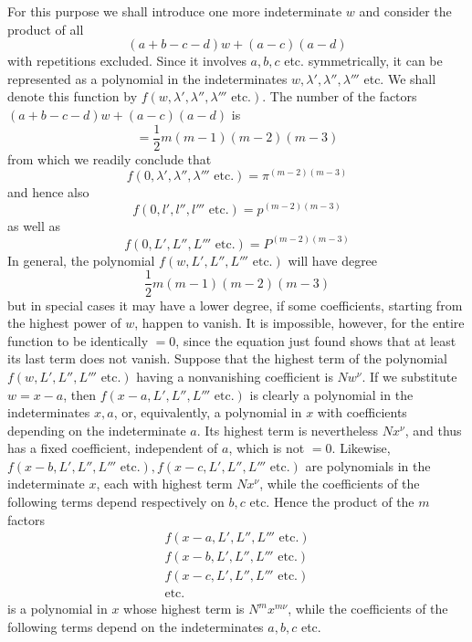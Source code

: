 For this purpose we shall introduce one more indeterminate $w$ and consider the product of all
\[
(a+b-c-d)w+(a-c)(a-d)
\]
with repetitions excluded. Since it involves $a,b,c$ etc. symmetrically, it can be represented as a polynomial in the indeterminates $w,\lambda',\lambda'',\lambda'''$ etc. We shall denote this function by $f(w,\lambda',\lambda'',\lambda'''\text{ etc.})$. The number of the factors $(a+b-c-d)w+(a-c)(a-d)$ is
\[
=\frac12m(m-1)(m-2)(m-3)
\]
from which we readily conclude that
\[
f(0,\lambda',\lambda'',\lambda'''\text{ etc.})=\pi^{(m-2)(m-3)}
\]
and hence also
\[
f(0,l',l'',l'''\text{ etc.})=p^{(m-2)(m-3)}
\]
as well as
\[
f(0,L',L'',L'''\text{ etc.})=P^{(m-2)(m-3)}
\]
In general, the polynomial $f(w,\allowbreak L',\allowbreak L'',\allowbreak L'''\text{ etc.})$ will have degree
\[
\frac12m(m-1)(m-2)(m-3)
\]
but in special cases it may have a lower degree, if some coefficients, starting from the highest power of $w$, happen to vanish. It is impossible, however, for the entire function to be identically $=0$, since
the equation just found shows that at least its last term does not vanish. Suppose that the highest term of the polynomial $f(w,\allowbreak L',\allowbreak L'',\allowbreak L'''\text{ etc.})$ having a nonvanishing coefficient is $Nw^\nu$. If we substitute $w=x-a$, then $f(x-a,L',L'',L'''\text{ etc.})$ is clearly a polynomial in the indeterminates $x,a$, or, equivalently, a polynomial in $x$ with coefficients depending on the indeterminate $a$. Its highest term is nevertheless $Nx^\nu$, and thus has a fixed coefficient, independent of $a$, which is not $=0$. Likewise, $f(x-b,L',L'',L'''\text{ etc.}),f(x-c,L',L'',L'''\text{ etc.})$ are polynomials in the indeterminate $x$, each with highest term $Nx^\nu$, while the coefficients of the following terms depend respectively on $b,c$ etc. Hence the product of the $m$ factors
\[
\begin{gathered}
f(x-a,L',L'',L'''\text{ etc.})\\
f(x-b,L',L'',L'''\text{ etc.})\\
f(x-c,L',L'',L'''\text{ etc.})\\
\text{etc.}
\end{gathered}
\]
is a polynomial in $x$ whose highest term is $N^mx^{m\nu}$, while the coefficients of the following terms depend on the indeterminates $a,b,c$ etc.


